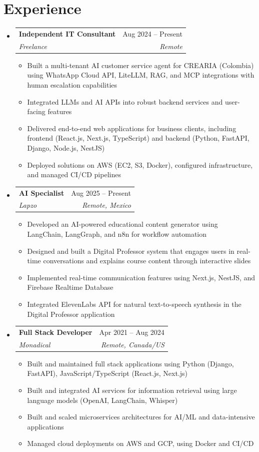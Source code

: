 \documentclass[letterpaper,11pt]{article}
\makeatletter
\newcommand{\resumeSubheading}[4]{
  \vspace{-2pt}
  \item[]
  \begin{tabular*}{\textwidth}{@{\extracolsep{\fill}}l r}
    \textbf{#1} & #2 \\
    \textit{#3} & \textit{#4} \\
  \end{tabular*}
  \vspace{-5pt}
}
\makeatother
\begin{document}
\section{Experience}
\begin{itemize}[leftmargin=0pt, itemindent=0pt, label={}, itemsep=1pt]
\resumeSubheading
{Independent IT Consultant}{Aug 2024 -- Present}
{Freelance}{Remote}
\begin{itemize}[leftmargin=*, itemsep=0pt]
    \item Built a multi-tenant AI customer service agent for CREARIA (Colombia) using WhatsApp Cloud API, LiteLLM, RAG, and MCP integrations with human escalation capabilities
    \item Integrated LLMs and AI APIs into robust backend services and user-facing features
    \item Delivered end-to-end web applications for business clients, including frontend (React.js, Next.js, TypeScript) and backend (Python, FastAPI, Django, Node.js, NestJS)
    \item Deployed solutions on AWS (EC2, S3, Docker), configured infrastructure, and managed CI/CD pipelines
\end{itemize}

\resumeSubheading
{AI Specialist}{Aug 2025 -- Present}
{Lapzo}{Remote, Mexico}
\begin{itemize}[leftmargin=*, itemsep=0pt]
    \item Developed an AI-powered educational content generator using LangChain, LangGraph, and n8n for workflow automation
    \item Designed and built a Digital Professor system that engages users in real-time conversations and explains course content through interactive slides
    \item Implemented real-time communication features using Next.js, NestJS, and Firebase Realtime Database
    \item Integrated ElevenLabs API for natural text-to-speech synthesis in the Digital Professor application
\end{itemize}

\resumeSubheading
{Full Stack Developer}{Apr 2021 -- Aug 2024}
{Monadical}{Remote, Canada/US}
\begin{itemize}[leftmargin=*, itemsep=0pt]
    \item Built and maintained full stack applications using Python (Django, FastAPI), JavaScript/TypeScript (React.js, Next.js)
    \item Built and integrated AI services for information retrieval using large language models (OpenAI, LangChain, Whisper)
    \item Built and scaled microservices architectures for AI/ML and data-intensive applications
    \item Managed cloud deployments on AWS and GCP, using Docker and CI/CD
\end{itemize}


\end{itemize}
\end{document}
